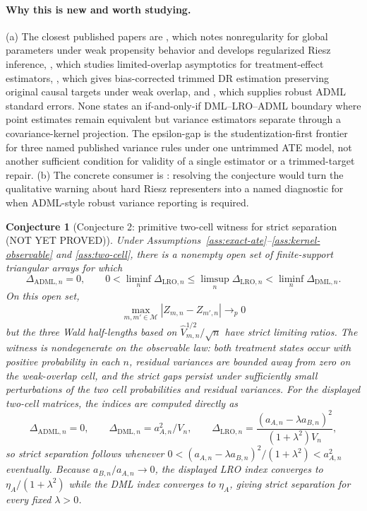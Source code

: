 \documentclass[11pt]{article}
\theoremstyle{definition}
\theoremstyle{plain}
\newtheorem{conjecture}{Conjecture}
\theoremstyle{remark}
\begin{document}
\paragraph{Why this is new and worth studying.}
(a) The closest published papers are \citet{ChernozhukovNeweySingh2022RR}, which notes nonregularity for global parameters under weak propensity behavior and develops regularized Riesz inference, \citet{HongLeungLi2020}, which studies limited-overlap asymptotics for treatment-effect estimators, \citet{MaSantAnnaSasakiUra2026WeakOverlapDR}, which gives bias-corrected trimmed DR estimation preserving original causal targets under weak overlap, and \citet{ChernozhukovNeweySingh2022ADML}, which supplies robust ADML standard errors.  None states an if-and-only-if DML--LRO--ADML boundary where point estimates remain equivalent but variance estimators separate through a covariance-kernel projection.  The epsilon-gap is the studentization-first frontier for three named published variance rules under one untrimmed ATE model, not another sufficient condition for validity of a single estimator or a trimmed-target repair.  (b) The concrete consumer is \citet{ChernozhukovNeweySingh2022RR}: resolving the conjecture would turn the qualitative warning about hard Riesz representers into a named diagnostic for when ADML-style robust variance reporting is required.

\begin{conjecture}[Conjecture 2: primitive two-cell witness for strict separation (NOT YET PROVED)]\label{conj:two-cell-witness}
Under Assumptions~\ref{ass:exact-ate}--\ref{ass:kernel-observable} and \ref{ass:two-cell}, there is a nonempty open set of finite-support triangular arrays for which
\[
  \Delta_{\mathrm{ADML},n}=0,\qquad
  0<\liminf_n\Delta_{\mathrm{LRO},n}
  \le \limsup_n\Delta_{\mathrm{LRO},n}
  < \liminf_n\Delta_{\mathrm{DML},n}.
\]
On this open set,
\[
  \max_{m,m'\in\mathcal M}|Z_{m,n}-Z_{m',n}|\to_p0
\]
but the three Wald half-lengths based on \(\hat V_{m,n}^{1/2}/\sqrt n\) have strict limiting ratios.  The witness is nondegenerate on the observable law: both treatment states occur with positive probability in each \(n\), residual variances are bounded away from zero on the weak-overlap cell, and the strict gaps persist under sufficiently small perturbations of the two cell probabilities and residual variances.  For the displayed two-cell matrices, the indices are computed directly as
\[
  \Delta_{\mathrm{ADML},n}=0,\qquad
  \Delta_{\mathrm{DML},n}=a_{A,n}^2/V_n,\qquad
  \Delta_{\mathrm{LRO},n}
  =
  \frac{(a_{A,n}-\lambda a_{B,n})^2}{(1+\lambda^2)V_n},
\]
so strict separation follows whenever \(0< (a_{A,n}-\lambda a_{B,n})^2/(1+\lambda^2)<a_{A,n}^2\) eventually.
Because \(a_{B,n}/a_{A,n}\to0\), the displayed LRO index converges to \(\eta_A/(1+\lambda^2)\) while the DML index converges to \(\eta_A\), giving strict separation for every fixed \(\lambda>0\).
\end{conjecture}
\end{document}

